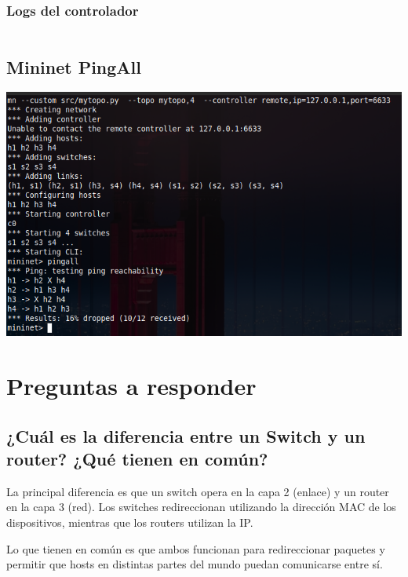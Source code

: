 \documentclass{article}
\begin{document}
\subsubsection{Logs del controlador}
\begin{center}
  \inputminted[fontsize=\default]{text}{informe/logs/Banned_Tuple_Log.txt}
\end{center}


\subsection{Mininet PingAll}
\begin{center}
\includegraphics[scale=0.35]{Mininet_Banned_Tupled.png}
\end{center}

\newpage
\section{Preguntas a responder}\label{preguntas-a-responder}

\subsection{¿Cuál es la diferencia entre un Switch y un router? ¿Qué tienen en común?}

La principal diferencia es que un switch opera en la capa 2 (enlace) y un router en la capa 3 (red). Los switches redireccionan utilizando la dirección MAC de los dispositivos, mientras que los routers utilizan la IP.

Lo que tienen en común es que ambos funcionan para redireccionar paquetes y permitir que hosts en distintas partes del mundo puedan comunicarse entre sí.
\end{document}
